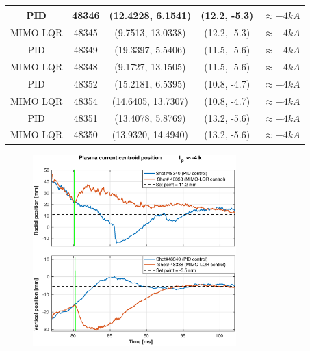 \begin{center}
\begin{longtable}{||c| c| c| c|c||}
		\hline
		PID & 48346 & (12.4228,	6.1541)  & (12.2, -5.3)& $\approx -4 kA$\\ 
		\hline
		MIMO LQR & 48345 & (9.7513,	13.0338) & (12.2, -5.3)& $\approx -4 kA$ \\
		\hline
		PID & 48349 & (19.3397,	5.5406)  & (11.5, -5.6)&$\approx -4 kA$  \\ 
		\hline
		MIMO LQR & 48348 & (9.1727,	13.1505) & (11.5, -5.6)&$\approx -4 kA$  \\
		\hline
		PID & 48352 &  (15.2181,	6.5395) & (10.8, -4.7) &$\approx -4 kA$ \\ 
		\hline
		MIMO LQR & 48354 & (14.6405,	13.7307) & (10.8, -4.7)& $\approx -4 kA$ \\
		\hline
		PID & 48351 &  (13.4078, 5.8769) & (13.2, -5.6)& $\approx -4 kA$ \\ 
		\hline
		MIMO LQR & 48350 & (13.9320,	14.4940) & (13.2, -5.6)&$\approx -4 kA$  \\[1ex]
		\hline
	\end{longtable}
\end{center}


\begin{figure}
	\centering
	\includegraphics[width=0.7\textwidth]{Chp5/PIDvsMIMO_340_338_2.eps}
\end{figure}